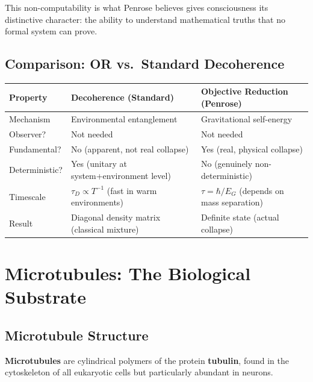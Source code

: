 \documentclass[11pt,a4paper]{report}
\begin{document}
This non-computability is what Penrose believes gives consciousness its distinctive character: the ability to understand mathematical truths that no formal system can prove.

\section{Comparison: OR vs.\ Standard Decoherence}

\begin{center}
\renewcommand{\arraystretch}{1.3}
\begin{tabular}{>{\raggedright}p{3.5cm} >{\raggedright}p{5cm} >{\raggedright\arraybackslash}p{5cm}}
  \toprule
  \textbf{Property} & \textbf{Decoherence (Standard)} & \textbf{Objective Reduction (Penrose)} \\
  \midrule
  Mechanism & Environmental entanglement & Gravitational self-energy \\
  Observer? & Not needed & Not needed \\
  Fundamental? & No (apparent, not real collapse) & Yes (real, physical collapse) \\
  Deterministic? & Yes (unitary at system+environment level) & No (genuinely non-deterministic) \\
  Timescale & $\tau_D \propto T^{-1}$ (fast in warm environments) & $\tau = \hbar/E_G$ (depends on mass separation) \\
  Result & Diagonal density matrix (classical mixture) & Definite state (actual collapse) \\
  \bottomrule
\end{tabular}
\end{center}


\chapter{Microtubules: The Biological Substrate}

\section{Microtubule Structure}

\textbf{Microtubules} are cylindrical polymers of the protein \textbf{tubulin}, found in the cytoskeleton of all eukaryotic cells but particularly abundant in neurons.
\end{document}
